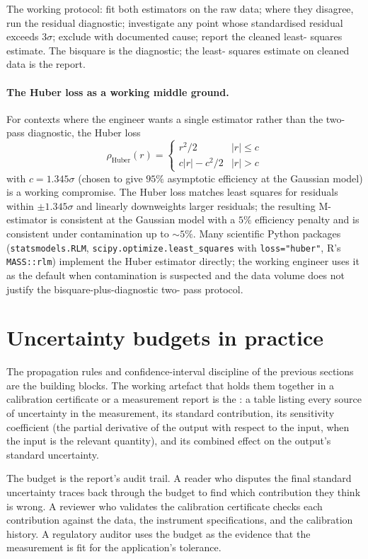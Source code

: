 The working protocol: fit both estimators on the raw data;
where they disagree, run the residual diagnostic; investigate
any point whose standardised residual exceeds $3\sigma$;
exclude with documented cause; report the cleaned least-
squares estimate. The bisquare is the diagnostic; the least-
squares estimate on cleaned data is the report.

\paragraph{The Huber loss as a working middle ground.} For
contexts where the engineer wants a single estimator rather
than the two-pass diagnostic, the Huber loss
\[
\rho_{\text{Huber}}(r) = \begin{cases}
r^{2}/2 & |r| \leq c \\
c|r| - c^{2}/2 & |r| > c
\end{cases}
\]
with $c = 1.345\sigma$ (chosen to give $95\%$ asymptotic
efficiency at the Gaussian model) is a working compromise.
The Huber loss matches least squares for residuals within
$\pm 1.345\sigma$ and linearly downweights larger residuals;
the resulting M-estimator is consistent at the Gaussian model
with a $5\%$ efficiency penalty and is consistent under
contamination up to $\sim 5\%$. Many scientific Python
packages (\texttt{statsmodels.RLM},
\texttt{scipy.optimize.least\_squares}
with \texttt{loss="huber"}, R's \texttt{MASS::rlm}) implement
the Huber estimator directly; the working engineer uses it
as the default when contamination is suspected and the data
volume does not justify the bisquare-plus-diagnostic two-
pass protocol.

\section{Uncertainty budgets in practice}

The propagation rules and confidence-interval discipline of the
previous sections are the building blocks. The working artefact
that holds them together in a calibration certificate or a
measurement report is the : a table
listing every source of uncertainty in the measurement, its
standard contribution, its sensitivity coefficient (the partial
derivative of the output with respect to the input, when the input
is the relevant quantity), and its combined effect on the
output's standard uncertainty.

The budget is the report's audit trail. A reader who disputes the
final standard uncertainty traces back through the budget to find
which contribution they think is wrong. A reviewer who validates
the calibration certificate checks each contribution against the
data, the instrument specifications, and the calibration history.
A regulatory auditor uses the budget as the evidence that the
measurement is fit for the application's tolerance.

